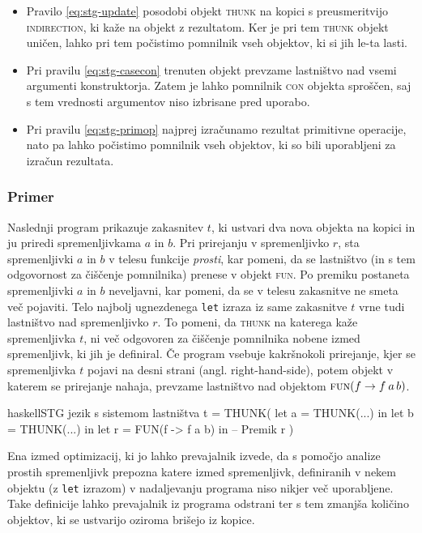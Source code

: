 \begin{itemize}
    \itemsep 0em
    \item Pravilo \ref{eq:stg-update} posodobi objekt \textsc{thunk} na kopici s preusmeritvijo \textsc{indirection}, ki kaže na objekt z rezultatom. Ker je pri tem \textsc{thunk} objekt uničen, lahko pri tem počistimo pomnilnik vseh objektov, ki si jih le-ta lasti.
    \item Pri pravilu \ref{eq:stg-casecon} trenuten objekt prevzame lastništvo nad vsemi argumenti konstruktorja. Zatem je lahko pomnilnik \textsc{con} objekta spro\-ščen, saj s tem vrednosti argumentov niso izbrisane pred uporabo. 
    \item Pri pravilu \ref{eq:stg-primop} najprej izračunamo rezultat primitivne operacije, nato pa lahko počistimo pomnilnik vseh objektov, ki so bili uporabljeni za izračun rezultata.
\end{itemize}

\subsubsection{Primer}

Naslednji program prikazuje zakasnitev $t$, ki ustvari dva nova objekta na kopici in ju priredi spremenljivkama $a$ in $b$. Pri prirejanju v spremenljivko $r$, sta spremenljivki $a$ in $b$ v telesu funkcije \emph{prosti}, kar pomeni, da se lastništvo (in s tem odgovornost za čiščenje pomnilnika) prenese v objekt \textsc{fun}. Po premiku postaneta spremenljivki $a$ in $b$ neveljavni, kar pomeni, da se v telesu zakasnitve ne smeta več pojaviti. Telo najbolj ugnezdenega \texttt{let} izraza iz same zakasnitve $t$ vrne tudi lastništvo nad spremenljivko $r$. To pomeni, da \textsc{thunk} na katerega kaže spremenljivka $t$, ni več odgovoren za čiščenje pomnilnika nobene izmed spremenljivk, ki jih je definiral. Če program vsebuje kakršnokoli prirejanje, kjer se spremenljivka $t$ pojavi na desni strani (angl. right-hand-side), potem objekt v katerem se prirejanje nahaja, prevzame lastništvo nad objektom $\textsc{fun}(f \to f \: a \, b)$.

\begin{code-box}{haskell}{STG jezik s sistemom lastništva \cmark}
t = THUNK(
    let a = THUNK(...)      in
    let b = THUNK(...)      in
    let r = FUN(f -> f a b) in  -- Premik
        r
)
\end{code-box}

Ena izmed optimizacij, ki jo lahko prevajalnik izvede, da s pomočjo analize prostih spremenljivk prepozna katere izmed spremenljivk, definiranih v nekem objektu (z \texttt{let} izrazom) v nadaljevanju programa niso nikjer več uporabljene. Take definicije lahko prevajalnik iz programa odstrani ter s tem zmanjša količino objektov, ki se ustvarijo oziroma brišejo iz kopice.

